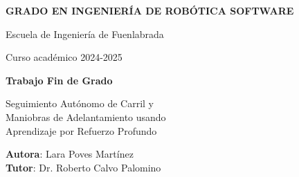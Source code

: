 \thispagestyle{empty}
\vspace{2cm}

\begin{figure}[htb]
  \centerline{}
\end{figure}

\begin{center}
  {\Large {\bf GRADO EN INGENIERÍA DE ROBÓTICA SOFTWARE}}
  \vspace{5mm}
 
  {\large {Escuela de Ingeniería de Fuenlabrada}}
  \vspace{5mm}

  {\large {Curso académico 2024-2025}}

  \vspace{1cm}

  {\large {\bf Trabajo Fin de Grado}}

  \vspace{2cm}

  {\Large {Seguimiento Autónomo de Carril y \\
	Maniobras de Adelantamiento usando\\
          Aprendizaje por Refuerzo Profundo\\[1cm] }}

  \vspace{5cm}
  {\bf Autora}: Lara Poves Martínez \\
  {\bf Tutor}: Dr. Roberto Calvo Palomino 

\end{center}

\clearpage
\thispagestyle{empty}
